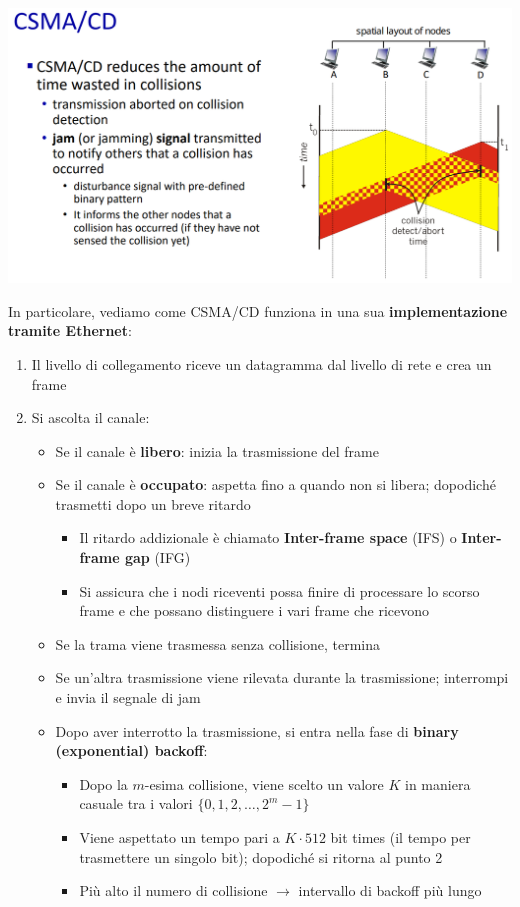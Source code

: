 \documentclass[12pt]{article}
\begin{document}
\begin{center}
    \includegraphics[width =1\linewidth]{Images/123.png}
\end{center}
In particolare, vediamo come CSMA/CD funziona in una sua \textbf{implementazione tramite Ethernet}:
\begin{enumerate}
    \item Il livello di collegamento riceve un datagramma dal livello di rete e crea un frame
    \item Si ascolta il canale:
    \begin{itemize}
        \item Se il canale è \textbf{libero}: inizia la trasmissione del frame
        \item Se il canale è \textbf{occupato}: aspetta fino a quando non si libera; dopodiché trasmetti dopo un breve ritardo
        \begin{itemize}
            \item Il ritardo addizionale è chiamato \textbf{Inter-frame space} (IFS) o \textbf{Inter-frame gap} (IFG)
            \item Si assicura che i nodi riceventi possa finire di processare lo scorso frame e che possano distinguere i vari frame che ricevono
        \end{itemize}
        \item Se la trama viene trasmessa senza collisione, termina
        \item Se un'altra trasmissione viene rilevata durante la trasmissione; interrompi e invia il segnale di jam
        \item Dopo aver interrotto la trasmissione, si entra nella fase di \textbf{binary (exponential) backoff}:
        \begin{itemize}
            \item Dopo la $m$-esima collisione, viene scelto un valore $K$ in maniera casuale tra i valori $\{0,1,2,\dots,2^{m}-1\}$
            \item Viene aspettato un tempo pari a $K \cdot 512$ bit times (il tempo per trasmettere un singolo bit); dopodiché si ritorna al punto 2
            \item Più alto il numero di collisione $\rightarrow$ intervallo di backoff più lungo
        \end{itemize}
    \end{itemize}
\end{enumerate}
\end{document}
